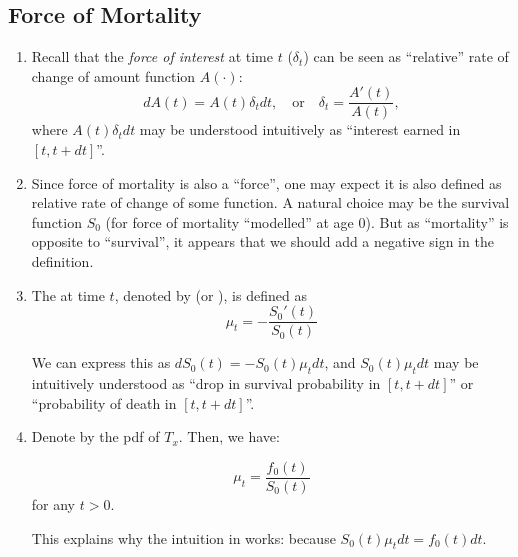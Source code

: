 \subsection{Force of Mortality}
\begin{enumerate}
\item Recall that the \emph{force of interest} at time \(t\) (\(\delta_t\)) can
be seen as ``relative'' rate of change of amount function \(A(\cdot)\):
\[
dA(t)=A(t)\delta_tdt,\quad\text{or}\quad
\delta_t=\frac{A'(t)}{A(t)},
\]
where \(A(t)\delta_tdt\) may be understood intuitively as ``interest earned in
\([t,t+dt]\)''.

\item Since force of mortality is also a ``force'', one may expect it is also
defined as relative rate of change of some function. A natural choice may be
the survival function \(S_0\) (for force of mortality ``modelled'' at age 0).
But as ``mortality'' is opposite to ``survival'', it appears that we should add
a negative sign in the definition.

\item \label{it:fom} The  at
time \(t\), denoted by  (or ), is defined as
\[
\mu_t=-\frac{S_0'(t)}{S_0(t)}
\]
\begin{intuition}
We can express this as \(dS_0(t)=-S_0(t)\mu_tdt\), and \(S_0(t)\mu_tdt\) may be
intuitively understood as ``drop in survival probability in \([t,t+dt]\)'' or
``probability of death in \([t,t+dt]\)''.

 \end{intuition}
\item Denote by  the pdf of \(T_x\). Then, we have:
\begin{proposition}
\label{prp:mu-pdf-0}
\[
\mu_t=\frac{f_0(t)}{S_0(t)}
\]
for any \(t>0\).
\end{proposition}

\begin{note}
This explains why the intuition in  works: because
\(S_0(t)\mu_tdt=f_0(t)dt\).
\end{note}


\end{enumerate}
